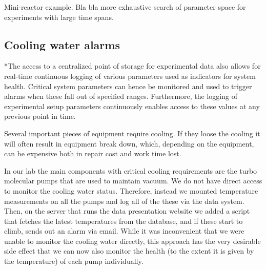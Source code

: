 Mini-reactor example. Bla bla more exhaustive search of parameter
space for experiments with large time spans. 

\subsection{Cooling water alarms}\label{sec:cooling_water_alarms}
*The access to a centralized point of storage for experimental data also allows
for real-time continuous logging of various parameters used as indicators for
system health. Critical system parameters can hence be monitored and used to
trigger alarms when these fall out of specified ranges. Furthermore, the
logging of experimental setup parameters continuously enables access to these
values at any previous point in time.

Several important pieces of equipment require cooling. If they loose
the cooling it will often result in equipment break down, which,
depending on the equipment, can be expensive both in repair cost and
work time lost.

In our lab the main components with critical cooling requirements are
the turbo molecular pumps that are used to maintain vacuum. We do not
have direct access to monitor the cooling water status. Therefore,
instead we mounted temperature measurements on all the pumps and log
all of the these via the data system. Then, on the server that runs
the data presentation website we added a script that fetches the
latest temperatures from the database, and if these start to climb,
sends out an alarm via email. While it was inconvenient that we were
unable to monitor the cooling water directly, this approach has the
very desirable side effect that we can now also monitor the health (to
the extent it is given by the temperature) of each pump
individually.
